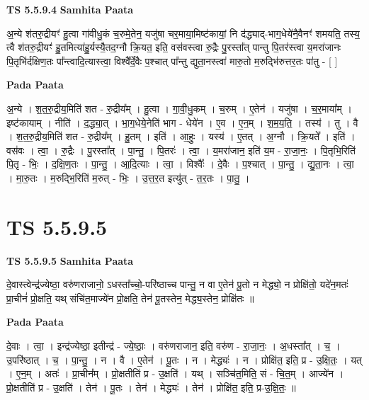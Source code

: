 \documentclass[17pt]{extarticle}
\begin{document}
\textbf{TS 5.5.9.4 } \newline
\textbf{Samhita Paata} \newline

अ॒न्ये श॑तरु॒द्रीयꣳ॑ हु॒त्वा गा॑वीधु॒कं च॒रुमे॒तेन॒ यजु॑षा चर॒माया॒मिष्ट॑कायां॒ नि द॑द्ध्याद्-भाग॒धेये॑नै॒वैनꣳ॑ शमयति॒ तस्य॒ त्वै श॑तरु॒द्रीयꣳ॑ हु॒तमित्या॑हु॒र्यस्यै॒तद॒ग्नौ क्रि॒यत॒ इति॒ वस॑वस्त्वा रु॒द्रैः पु॒रस्ता᳚त् पान्तु पि॒तर॑स्त्वा य॒मरा॑जानः पि॒तृभि॑र्दक्षिण॒तः पा᳚न्त्वादि॒त्यास्त्वा॒ विश्वै᳚र्दे॒वैः प॒श्चात् पा᳚न्तु द्युता॒नस्त्वा॑ मारु॒तो म॒रुद्भि॑रुत्तर॒तः पा॑तु - [  ] \newline

\textbf{Pada Paata} \newline

अ॒न्ये । श॒त॒रु॒द्रीय॒मिति॑ शत - रु॒द्रीय᳚म् । हु॒त्वा । गा॒वी॒धु॒कम् । च॒रुम् । ए॒तेन॑ । यजु॑षा । च॒र॒माया᳚म् । इष्ट॑कायाम् । नीति॑ । द॒द्ध्या॒त् । भा॒ग॒धेये॒नेति॑ भाग - धेये॑न । ए॒व । ए॒न॒म् । श॒म॒य॒ति॒ । तस्य॑ । तु । वै । श॒त॒रु॒द्रीय॒मिति॑ शत - रु॒द्रीय᳚म् । हु॒तम् । इति॑ । आ॒हुः॒ । यस्य॑ । ए॒तत् । अ॒ग्नौ । क्रि॒यते᳚ । इति॑ । वस॑वः । त्वा॒ । रु॒द्रैः । पु॒रस्ता᳚त् । पा॒न्तु॒ । पि॒तरः॑ । त्वा॒ । य॒मरा॑जान॒ इति॑ य॒म - रा॒जा॒नः॒ । पि॒तृभि॒रिति॑ पि॒तृ - भिः॒ । द॒क्षि॒ण॒तः । पा॒न्तु॒ । आ॒दि॒त्याः । त्वा॒ । विश्वैः᳚ । दे॒वैः । प॒श्चात् । पा॒न्तु॒ । द्यु॒ता॒नः । त्वा॒ । मा॒रु॒तः । म॒रुद्भि॒रिति॑ म॒रुत् - भिः॒ । उ॒त्त॒र॒त इत्यु॑त् - त॒र॒तः । पा॒तु॒ ।  \newline




\section*{ TS 5.5.9.5 }

\textbf{TS 5.5.9.5 } \newline
\textbf{Samhita Paata} \newline

दे॒वास्त्वेन्द्र॑ज्येष्ठा॒ वरु॑णराजानो॒ ऽधस्ता᳚च्चो॒-परि॑ष्ठाच्च पान्तु॒ न वा ए॒तेन॑ पू॒तो न मेद्ध्यो॒ न प्रोक्षि॑तो॒ यदे॑न॒मतः॑ प्रा॒चीनं॑ प्रो॒क्षति॒ यथ् संचि॑त॒माज्ये॑न प्रो॒क्षति॒ तेन॑ पू॒तस्तेन॒ मेद्ध्य॒स्तेन॒ प्रोक्षि॑तः ॥ \newline

\textbf{Pada Paata} \newline

दे॒वाः । त्वा॒ । इन्द्र॑ज्येष्ठा॒ इतीन्द्र॑ - ज्ये॒ष्ठाः॒ । वरु॑णराजान॒ इति॒ वरु॑ण - रा॒जा॒नः॒ । अ॒धस्ता᳚त् । च॒ । उ॒परि॑ष्ठात् । च॒ । पा॒न्तु॒ । न । वै । ए॒तेन॑ । पू॒तः । न । मेद्ध्यः॑ । न । प्रोक्षि॑त॒ इति॒ प्र - उ॒क्षि॒तः॒ । यत् । ए॒न॒म् । अतः॑ । प्रा॒चीन᳚म् । प्रो॒क्षतीति॑ प्र - उ॒क्षति॑ । यथ् । सञ्चि॑त॒मिति॒ सं - चि॒त॒म् । आज्ये॑न । प्रो॒क्षतीति॑ प्र - उ॒क्षति॑ । तेन॑ । पू॒तः । तेन॑ । मेद्ध्यः॑ । तेन॑ । प्रोक्षि॑त॒ इति॒ प्र-उ॒क्षि॒तः॒ ॥  \newline
\end{document}
